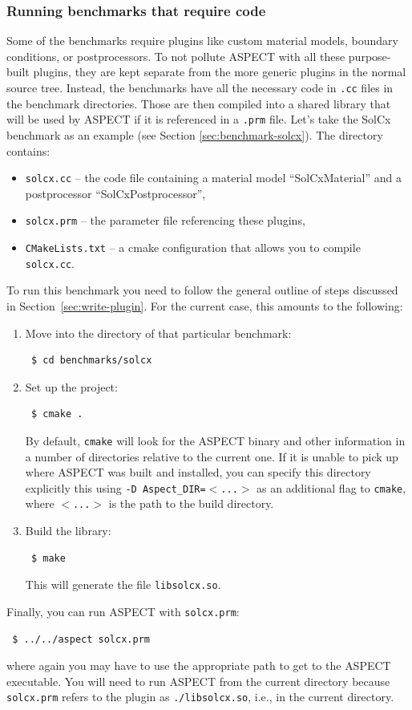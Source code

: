 \documentclass{article}
\newcommand{\aspect}{\textsc{ASPECT}}
\begin{document}
\subsubsection{Running benchmarks that require code}
\label{sec:benchmark-run}

Some of the benchmarks require plugins like custom material models, boundary
conditions, or postprocessors. To not pollute \aspect{} with all these
purpose-built plugins, they are kept separate from the more generic plugins in
the normal source tree. Instead, the benchmarks have all the necessary code in
\texttt{.cc} files in the benchmark directories. Those are then compiled into a shared
library that will be used by \aspect{} if it is referenced in a \texttt{.prm}
file. Let's take the SolCx benchmark as an example (see Section \ref{sec:benchmark-solcx}).
The directory contains:
\begin{itemize}
 \item \texttt{solcx.cc} -- the code file containing a material model
   ``SolCxMaterial'' and a postprocessor ``SolCxPostprocessor'',
 \item \texttt{solcx.prm} -- the parameter file referencing these plugins,
 \item \texttt{CMakeLists.txt} -- a cmake configuration that allows you to
   compile \texttt{solcx.cc}.
\end{itemize}
To run this benchmark you need to follow the general outline of
steps discussed in Section~\ref{sec:write-plugin}. For the current case, this
amounts to the following:
\begin{enumerate}
 \item Move into the directory of that particular benchmark:
\begin{verbatim}
 $ cd benchmarks/solcx
\end{verbatim} 
 \item Set up the project:
\begin{verbatim}
 $ cmake .  
\end{verbatim}
 By default, \texttt{cmake} will look for the \aspect{} binary and other
 information in a number of directories relative to the current one.
 If it is unable to pick up where \aspect{} was built and installed, you can
 specify this directory explicitly this using \texttt{-D
   Aspect\_DIR=$<$...$>$} as an additional flag to \texttt{cmake}, where
 \texttt{$<$...$>$} is the path to the build directory.
 \item Build the library:
\begin{verbatim}
 $ make
\end{verbatim}
 This will generate the file \texttt{libsolcx.so}.
\end{enumerate}
Finally, you can run \aspect{} with \texttt{solcx.prm}:
\begin{verbatim}
 $ ../../aspect solcx.prm
\end{verbatim}
where again you may have to use the appropriate path to get to the \aspect{}
executable. You will need to run \aspect{} from the current directory because
\texttt{solcx.prm} refers to the plugin as \texttt{./libsolcx.so}, i.e., in
the current directory.
\end{document}
